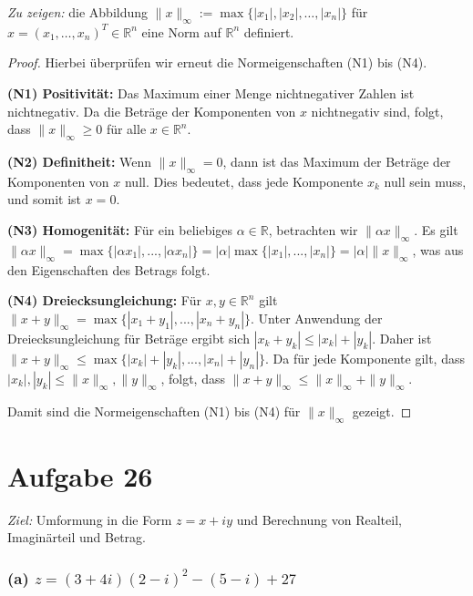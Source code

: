 \documentclass{article}
\theoremstyle{definition}
\theoremstyle{remark}
\begin{document}
\textit{Zu zeigen:} die Abbildung \( \| x \|_{\infty} := \max \{ |x_1|, |x_2|, \ldots, |x_n| \} \) für \( x = (x_1, \ldots, x_n)^T \in \mathbb{R}^n \) eine Norm auf \( \mathbb{R}^n \) definiert.

\begin{proof} Hierbei überprüfen wir erneut die Normeigenschaften (N1) bis (N4).

	\textbf{(N1) Positivität:}
	Das Maximum einer Menge nichtnegativer Zahlen ist nichtnegativ. Da die Beträge der Komponenten von \( x \) nichtnegativ sind, folgt, dass \( \| x \|_{\infty} \geq 0 \) für alle \( x \in \mathbb{R}^n \).

	\textbf{(N2) Definitheit:}
	Wenn \( \| x \|_{\infty} = 0 \), dann ist das Maximum der Beträge der Komponenten von \( x \) null. Dies bedeutet, dass jede Komponente \( x_k \) null sein muss, und somit ist \( x = 0 \).

	\textbf{(N3) Homogenität:}
	Für ein beliebiges \( \alpha \in \mathbb{R} \), betrachten wir \( \| \alpha x \|_{\infty} \). Es gilt \( \| \alpha x \|_{\infty} = \max \{ |\alpha x_1|, ..., |\alpha x_n| \} = |\alpha| \max \{ |x_1|, ..., |x_n| \} = |\alpha| \| x \|_{\infty} \), was aus den Eigenschaften des Betrags folgt.

	\textbf{(N4) Dreiecksungleichung:}
	Für \( x, y \in \mathbb{R}^n \) gilt \( \| x + y \|_{\infty} = \max \{ |x_1 + y_1|, ..., |x_n + y_n| \} \). Unter Anwendung der Dreiecksungleichung für Beträge ergibt sich \( |x_k + y_k| \leq |x_k| + |y_k| \). Daher ist \( \| x + y \|_{\infty} \leq \max \{ |x_k| + |y_k|, ..., |x_n| + |y_n| \} \). Da für jede Komponente gilt, dass \( |x_k|, |y_k| \leq \| x \|_{\infty}, \| y \|_{\infty} \), folgt, dass \( \| x + y \|_{\infty} \leq \| x \|_{\infty} + \| y \|_{\infty} \).

	Damit sind die Normeigenschaften (N1) bis (N4) für \( \| x \|_{\infty} \) gezeigt.
\end{proof}


\section*{Aufgabe 26}

\textit{Ziel:} Umformung in die Form \( z = x + iy \) und Berechnung von Realteil, Imaginärteil und Betrag.

\subsubsection*{(a) \( z = (3 + 4i)(2 - i)^{2} - (5 - i) + 27\)}
\end{document}
